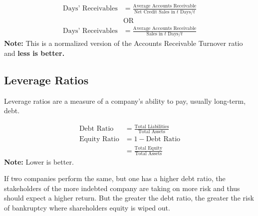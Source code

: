 \begin{theorem}
    \begin{align}
        \text{Days' Receivables} & = \frac{\text{Average Accounts Receivable}}{\text{Net Credit Sales in } t\text{ Days} / t} \\
                                 & \text{OR}                                                                                  \\
        \text{Days' Receivables} & = \frac{\text{Average Accounts Receivable}}{\text{Sales in } t\text{ Days} / t}
    \end{align}
    \textbf{Note:} This is a normalized version of the Accounts Receivable Turnover ratio and \textbf{less is better.}
\end{theorem}

\subsection{Leverage Ratios}

\begin{definition}
    Leverage ratios are a measure of a company's ability to pay, usually long-term, debt.
\end{definition}

\begin{theorem}
    \begin{align}
        \text{Debt Ratio}   & = \frac{\text{Total Liabilities}}{\text{Total Assets}} \\
        \text{Equity Ratio} & = 1 - \text{Debt Ratio}                                \\
                            & = \frac{\text{Total Equity}}{\text{Total Assets}}
    \end{align}
    \textbf{Note:} Lower is better.
\end{theorem}

\begin{proposition}

    If two companies perform the same, but one has a higher debt ratio, the stakeholders of the more indebted company are taking on more risk and thus should expect a higher return. But the greater the debt ratio, the greater the risk of bankruptcy where shareholders equity is wiped out.
\end{proposition}

